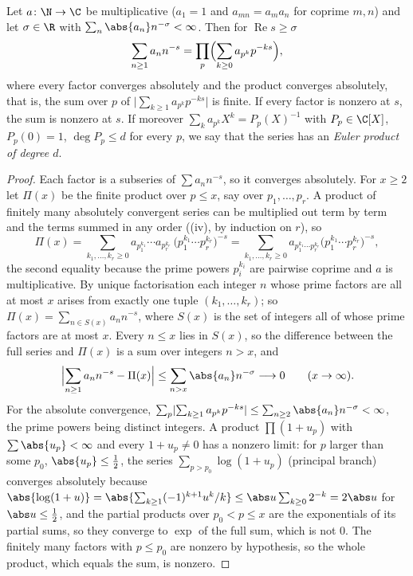 \begin{proposition}\label{prop:lfunctions:euler-product}
Let $a\colon\N\to\C$ be multiplicative ($a_1=1$ and $a_{mn}=a_ma_n$ for coprime $m,n$) and let $\sigma\in\R$ with $\sum_n\abs{a_n}n^{-\sigma}<\infty$. Then for $\operatorname{Re}s\ge\sigma$
\[
\sum_{n\ge1}a_nn^{-s}=\prod_p\Bigl(\sum_{k\ge0}a_{p^k}p^{-ks}\Bigr),
\]
where every factor converges absolutely and the product converges absolutely, that is, the sum over $p$ of $\bigl\lvert\sum_{k\ge1}a_{p^k}p^{-ks}\bigr\rvert$ is finite. If every factor is nonzero at
$s$, the sum is nonzero at $s$. If moreover $\sum_ka_{p^k}X^k=P_p(X)^{-1}$ with $P_p\in\C[X]$, $P_p(0)=1$, $\deg P_p\le d$ for every $p$, we say that the series has an
\emph{Euler product of degree $d$}.
\end{proposition}

\begin{proof}
Each factor is a subseries of $\sum a_nn^{-s}$, so it converges absolutely. For $x\ge2$ let $\Pi(x)$ be the finite product over $p\le x$, say over $p_1,\dots,p_r$. A product
of finitely many absolutely convergent series can be multiplied out term by term and the terms summed in any order ((iv), by
induction on $r$), so
\[
\Pi(x)=\sum_{k_1,\dots,k_r\ge0}a_{p_1^{k_1}}\cdots a_{p_r^{k_r}}\,\bigl(p_1^{k_1}\cdots p_r^{k_r}\bigr)^{-s}=\sum_{k_1,\dots,k_r\ge0}a_{p_1^{k_1}\cdots p_r^{k_r}}\bigl(p_1^{k_1}\cdots p_r^{k_r}\bigr)^{-s},
\]
the second equality because the prime powers $p_i^{k_i}$ are pairwise coprime and $a$ is multiplicative. By unique factorisation each integer $n$ whose prime factors are
all at most $x$ arises from exactly one tuple $(k_1,\dots,k_r)$; so $\Pi(x)=\sum_{n\in S(x)}a_nn^{-s}$, where $S(x)$ is the set of integers all of whose prime factors are at
most $x$. Every $n\le x$ lies in $S(x)$, so the difference between the full series and $\Pi(x)$ is a sum over integers $n>x$, and
\[
\Bigl\lvert\sum_{n\ge1}a_nn^{-s}-\Pi(x)\Bigr\rvert\le\sum_{n>x}\abs{a_n}n^{-\sigma}\longrightarrow0\qquad(x\to\infty).
\]
For the absolute convergence, $\sum_p\lvert\sum_{k\ge1}a_{p^k}p^{-ks}\rvert\le\sum_{n\ge2}\abs{a_n}n^{-\sigma}<\infty$, the prime powers being distinct integers. A product
$\prod(1+u_p)$ with $\sum\abs{u_p}<\infty$ and every $1+u_p\ne0$ has a nonzero limit: for $p$ larger than some $p_0$, $\abs{u_p}\le\frac12$, the series $\sum_{p>p_0}\log(1+u_p)$ (principal branch)
converges absolutely because $\abs{\log(1+u)}=\abs{\sum_{k\ge1}(-1)^{k+1}u^k/k}\le\abs u\sum_{k\ge0}2^{-k}=2\abs u$ for $\abs u\le\frac12$, and the partial products over $p_0<p\le x$ are the
exponentials of its partial sums, so they converge to $\exp$ of the full sum, which is not $0$. The finitely many factors with $p\le p_0$ are nonzero by hypothesis, so the whole
product, which equals the sum, is nonzero.
\end{proof}

